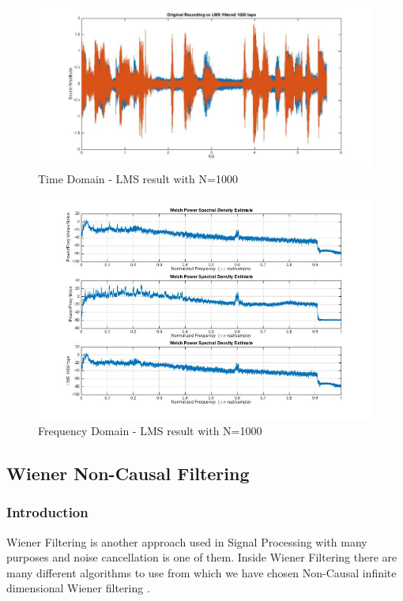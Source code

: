 \documentclass[11pt,a4paper,spanish]{book}  %
\theoremstyle{definition}  %
\theoremstyle{plain}  %
\theoremstyle{remark}  %
\begin{document}
		\begin{figure}[h]
		\centering
		\includegraphics[width=15cm]{images/theory/lms1000tapstime.jpg}
		\caption{Time Domain - LMS result with N=1000}
		\label{fig:lmstime1000}
		\end{figure}
		
		
		\begin{figure}[h]
		\centering
		\includegraphics[width=15cm]{images/theory/lms100tapsfreq.jpg}
		\caption{Frequency Domain - LMS result with N=1000}
		\label{fig:lmsfreq1000}
		\end{figure}

	\subsection{Wiener Non-Causal Filtering}
	
	\subsubsection{Introduction}
	
	
	Wiener Filtering is another approach used in Signal Processing with many purposes and noise cancellation is one of them. Inside Wiener Filtering there are many different algorithms to use from which we have chosen Non-Causal infinite dimensional Wiener filtering \cite{asp}.
	
\end{document}

